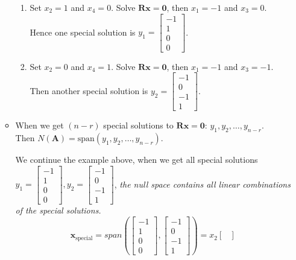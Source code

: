 \begin{itemize}
\begin{itemize}
\begin{example}
\begin{enumerate}
\item
Set $x_2=1$ and $x_4=0$. Solve $\bm{Rx} = \bm 0$, then $x_1=-1$ and $x_3 = 0$. \\Hence one special solution is $y_1 = \begin{bmatrix}
-1\\1\\0\\0
\end{bmatrix}$.
\item
Set $x_2=0$ and $x_4=1$. Solve $\bm{Rx} = \bm 0$, then $x_1=-1$ and $x_3 = -1$. \\Then another special solution is $y_2 = \begin{bmatrix}
-1\\0\\-1\\1
\end{bmatrix}$.
\end{enumerate}
\end{example}
\item
When we get $(n-r)$ special solutions to $\bm{Rx} = \bm 0$: $y_1,y_2,\dots,y_{n-r}.$
\\Then $N(\bm A) = \text{span}(y_1,y_2,\dots,y_{n-r})$.
\begin{example}
We continue the example above, when we get all special solutions $y_1 = \begin{bmatrix}
-1\\1\\0\\0
\end{bmatrix},y_2 = \begin{bmatrix}
-1\\0\\-1\\1
\end{bmatrix}$, \emph{the null space contains all linear combinations of the special solutions.}\\
\[
\bm x_{\text{special}} = span(\begin{bmatrix}
-1\\1\\0\\0
\end{bmatrix},\begin{bmatrix}
-1\\0\\-1\\1
\end{bmatrix}) = x_2\begin{bmatrix}

\end{bmatrix}\]
\end{example}
\end{itemize}
\end{itemize}
